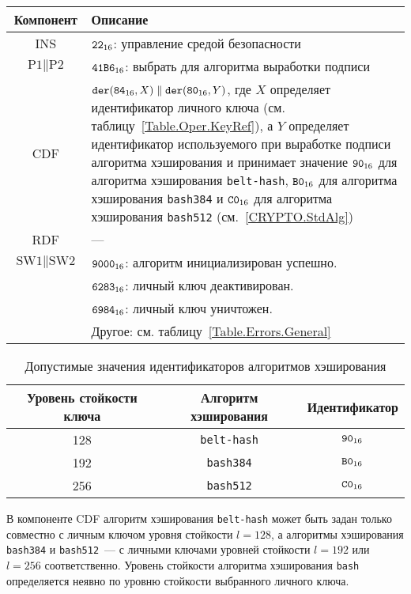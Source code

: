 \begin{table}[hbt]
\caption{}\label{Table.Oper.SetDSTCmd}
\begin{tabular}{|c|p{14cm}|}
\hline
Компонент & Описание \\
\hline
\hline
INS & $\texttt{22}_{16}$: управление средой безопасности\\ 
\hline
$\text{P1} \parallel\text{P2}$ & $\texttt{41B6}_{16}$: 
выбрать для алгоритма выработки подписи \\
\hline
CDF & 
$\texttt{der}(\texttt{84}_{16}, X) \parallel \texttt{der}(\texttt{80}_{16}, Y)$, 
где $X$ определяет идентификатор личного ключа (см. таблицу~\ref{Table.Oper.KeyRef}), 
а $Y$ определяет идентификатор используемого при выработке
подписи алгоритма хэширования 
и принимает значение $\texttt{90}_{16}$ для алгоритма хэширования \texttt{belt-hash},  
$\texttt{B0}_{16}$ для алгоритма хэширования \texttt{bash384} и 
$\texttt{C0}_{16}$ для алгоритма хэширования \texttt{bash512} (см.~\ref{CRYPTO.StdAlg})\\
\hline 
RDF &  --- \\
\hline
$\text{SW1} \parallel \text{SW2}$ & 
$\texttt{9000}_{16}$: алгоритм инициализирован успешно. \\
  & $\texttt{6283}_{16}$: личный ключ деактивирован. \\
  & $\texttt{6984}_{16}$: личный ключ уничтожен. \\
  & Другое: см. таблицу~\ref{Table.Errors.General} \\
\hline
\end{tabular}
\end{table}


\begin{table}[hbt]
\caption{Допустимые значения идентификаторов алгоритмов хэширования}
\label{Table.Oper.AlgRef}
\begin{tabular}{|c|c|c|}
\hline
Уровень стойкости ключа & Алгоритм хэширования  & Идентификатор  \\
\hline
\hline
128 & \texttt{belt-hash} & $\texttt{90}_{16}$ \\
192 & \texttt{bash384} & $\texttt{B0}_{16}$ \\
256 & \texttt{bash512} & $\texttt{C0}_{16}$ \\
\hline
\end{tabular}
\end{table}

\fi


В компоненте CDF алгоритм хэширования \texttt{belt-hash}
может быть задан только совместно с личным ключом 
уровня стойкости $l=128$,
а алгоритмы хэширования \texttt{bash384} и \texttt{bash512}~--- 
с личными ключами уровней стойкости $l=192$ или $l=256$
соответственно.
Уровень стойкости алгоритма хэширования \texttt{bash} определяется 
неявно по уровню стойкости выбранного личного ключа.

